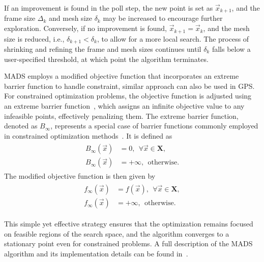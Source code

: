 If an improvement is found in the poll step, the new point is set as $ \vec{x}_{k+1} $, and the frame size $ \Delta_k $ and mesh size $ \delta_k $ may be increased to encourage further exploration. Conversely, if no improvement is found, $ \vec{x}_{k+1} = \vec{x}_k $, and the mesh size is reduced, i.e., $ \delta_{k+1} < \delta_k $, to allow for a more local search. The process of shrinking and refining the frame and mesh sizes continues until $ \delta_k $ falls below a user-specified threshold, at which point the algorithm terminates.

MADS employs a modified objective function that incorporates an extreme barrier function to handle constraint, similar approach can also be used in GPS. For constrained optimization problems, the objective function is adjusted using an extreme barrier function~\cite{BBO-textbook}, which assigns an infinite objective value to any infeasible points, effectively penalizing them. The extreme barrier function, denoted as $B_{\infty}$, represents a special case of barrier functions commonly employed in constrained optimization methods~\cite{Bert}. It is defined as
\begin{align}
	\begin{split}
		B_{\infty}(\vec{x}) &= 0, \ \ \forall \vec{x} \in \mathbf{X},\\[6pt]
		B_{\infty}(\vec{x}) &= +\infty, \ \ \text{otherwise.}
	\end{split}
\end{align}
The modified objective function is then given by
\begin{align}\label{eq:extreme barrier}
	\begin{split}
		f_{\infty}(\vec{x}) &= f(\vec{x}) , \ \ \forall \vec{x} \in \mathbf{X},\\[6pt]
		f_{\infty}(\vec{x}) &= +\infty, \ \ \text{otherwise.}
	\end{split}
\end{align}

This simple yet effective strategy ensures that the optimization remains focused on feasible regions of the search space, and the algorithm converges to a stationary point even for constrained problems. A full description of the MADS algorithm and its implementation details can be found in~\cite{BBO-textbook}.

